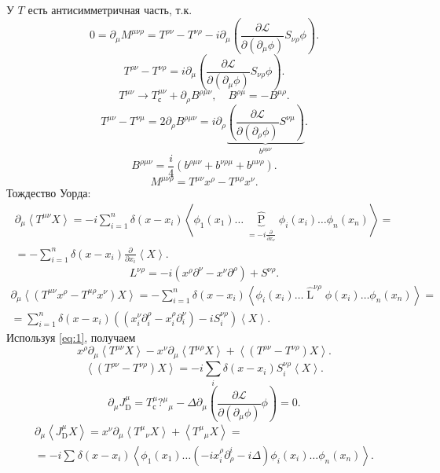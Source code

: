 \documentclass[a4paper]{article}
\begin{document}
У $T$ есть антисимметричная часть, т.\:к.
\[
0= \partial_\mu M^{\mu\nu \rho}=T ^{\rho \nu}-
T^{\nu \rho}- i \partial_\mu \left( 
\frac{\partial \mathcal{L}}{\partial \left( \partial_\mu
\phi\right) } S_{\nu\rho}\phi\right) 
.\] 
\[
	T^{\rho \nu}- T ^{\nu \rho}= i \partial_\mu \left( 
	\frac{\partial \mathcal{L}}{\partial \left( 
\partial_\mu \phi\right) } S_{\nu\rho} \phi\right) 
.\] 
\[
	T^{\mu\nu} \to  T_\text{с}^{\mu\nu} + \partial_\rho B^{
	\rho \mu \nu},\quad B^{\rho \mu}= -B ^{\mu \rho}
.\] 
\[
T^{\mu\nu}-T^{\nu\mu}= 2\partial_\rho B^{\rho \mu \nu}=
i \partial_\rho\underbrace{ \left( 
\frac{\partial \mathcal{L}}{\partial \left( \partial_\rho \phi \right) } S^{\nu\mu}\right) }_{b^{\rho \mu\nu}}
.\] 
\[
	B^{\rho \mu\nu}= \frac{i}{4} \left( 
	b^{\rho \mu\nu}+b ^{\nu \rho \mu}+ b^{\mu \nu \rho}\right) 
.\] 
\[
M^{\mu \nu \rho}=T^{\mu\nu}x^{\rho}-
T^{\mu \rho}x^\nu
.\] 
Тождество Уорда:
\begin{multline}
\partial_\mu \left< T^{\mu\nu} X \right> =
- i \sum_{i=1}^{n} \delta(x-x_i) \left<
\phi_1 (x_1) \ldots \underbrace{\widehat{\operatorname{P}}}_{
=-i \frac{\partial }{\partial x_\nu} }\phi_i (x_i)\ldots
\phi_n (x_n)\right>=\\=
- \sum_{i=1}^{n} \delta(x-x_i) \frac{\partial }{\partial x_i} 
\left<X \right>
\label{eq:1}
.\end{multline} 
\[
	L^{\nu \rho}= -i \left( x^\rho \partial^\nu
	-x^\nu \partial^\rho\right) +S^{\nu \rho}
.\] 
\begin{multline*}
	\partial_\mu \left< \left( T^{\mu\nu}x^\rho
	-T^{\mu \rho}x^\nu\right) X \right> =
	- \sum_{i=1}^{n} \delta (x-x_i) 
	\left< \phi_i (x_i) \ldots \widehat{\operatorname{L}}^{\nu\rho} \phi(x_i) \ldots \phi_n(x_n) \right> =\\=
	\sum_{i=1}^{n} \delta(x-x_i) \left( 
	\left( x_i^\nu \partial_i^\rho-x_i^\rho \partial_i^\nu \right) -i S_i^{\nu\rho}\right) \left<X \right>
.\end{multline*} 
Используя \ref{eq:1}, получаем
\[
x^\rho \partial_\mu \left< T^{\mu\nu} X \right>-
x^\nu \partial_\mu \left< T^{\mu\rho} X \right>+
\left<\left( T^{\rho\nu}-T^{\nu\rho} \right) X \right>
.\] 
\[
	\left<\left( T^{\rho\nu}-T^{\nu\rho} \right) X \right>
	=-i \sum_{i}^{} \delta(x-x_i) S^{\nu \rho}_i \left<X \right>
.\] 
\[
	\partial_\mu J^\mu _\text{D}=T^\mu_\text{с}?^\mu {}_\mu
	-\Delta \partial_\mu \left( \frac{\partial \mathcal{L}}{\partial (\partial_\mu \phi)} \phi \right) =0
.\] 
\begin{multline*}
	\partial_\mu \left< J^\mu_\text{D} X \right> = x^\nu \partial_\mu \left<T^\mu {}_\nu X \right>+\left<
	T^\mu{}_\mu X\right>=\\=
	-i\sum_{}^{} \delta(x-x_i) \left<
	\phi_1(x_1)\ldots \left(-i x_i^\rho \partial_\rho^i -i \Delta\right) \phi_i (x_i) \ldots \phi_n(x_n)\right>
.\end{multline*} 
\end{document}
